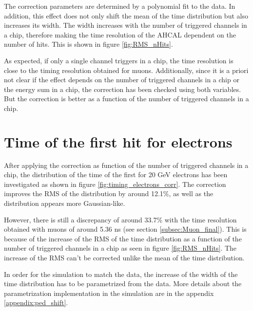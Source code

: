 The correction parameters are determined by a polynomial fit to the data. In addition, this effect does not only shift the mean of the time distribution but also increases its width. The width increases with the number of triggered channels in a chip, therefore making the time resolution of the AHCAL dependent on the number of hits. This is shown in figure \ref{fig:RMS_nHits}.

As expected, if only a single channel triggers in a chip, the time resolution is close to the timing resolution obtained for muons. Additionally, since it is a priori not clear if the effect depends on the number of triggered channels in a chip or the energy sum in a chip, the correction has been checked using both variables. But the correction is better as a function of the number of triggered channels in a chip.

\section{Time of the first hit for electrons}
\label{subsec:Electron_Final}

After applying the correction as function of the number of triggered channels in a chip, the distribution of the time of the first for 20 GeV electrons has been investigated as shown in figure \ref{fig:timing_electrons_corr}. The correction improves the RMS of the distribution by around 12.1\%, as well as the distribution appears more Gaussian-like.

However, there is still a discrepancy of around 33.7\% with the time resolution obtained with muons of around 5.36 ns (see section \ref{subsec:Muon_final}). This is because of the increase of the RMS of the time distribution as a function of the number of triggered channels in a chip as seen in figure \ref{fig:RMS_nHits}. The increase of the RMS can't be corrected unlike the mean of the time distribution.

In order for the simulation to match the data, the increase of the width of the time distribution has to be parametrized from the data. More details about the parametrization implementation in the simulation are in the appendix \ref{appendix:ped_shift}.

